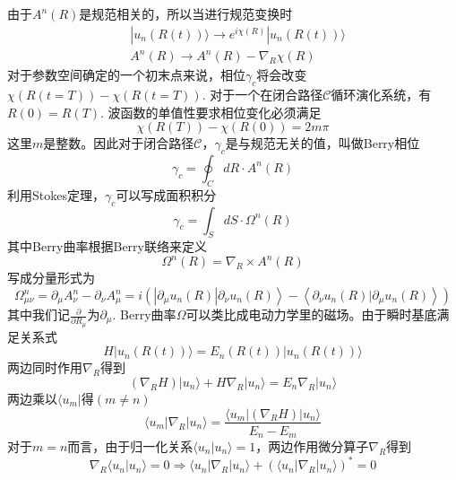 \documentclass{article}
\numberwithin{equation}{subsection}
\begin{document}
由于$A^n(R)$是规范相关的，所以当进行规范变换时
\begin{equation}
    \begin{split}
        &|u_n(R(t))\rangle\rightarrow e^{i\chi(R)}|u_n(R(t))\rangle\\
        &A^n(R)\rightarrow A^n(R)-\nabla_R\chi(R)
    \end{split}
\end{equation}
对于参数空间确定的一个初末点来说，相位$\gamma_c$将会改变$\chi(R(t=T))-\chi(R(t=T))$. 对于一个在闭合路径$\mathcal{C}$循环演化系统，有$R(0)=R(T)$. 波函数的单值性要求相位变化必须满足
\begin{equation}
    \chi(R(T))-\chi(R(0))=2m\pi
\end{equation}
这里$m$是整数。因此对于闭合路径$\mathcal{C}$，$\gamma_c$是与规范无关的值，叫做Berry相位
\begin{equation}
    \gamma_c=\oint_C dR\cdot A^n(R)
\end{equation}
利用Stokes定理，$\gamma_c$可以写成面积积分
\begin{equation}
    \gamma_c=\int_S dS\cdot\Omega^n(R)
\end{equation}
其中Berry曲率根据Berry联络来定义
\begin{equation}
    \Omega^n(R)=\nabla_R\times A^n(R)
\end{equation}
写成分量形式为
\begin{equation}
    \Omega_{\mu\nu}^n=\partial_\mu A_\nu^n-\partial_\nu A_\mu^n=i\left.\left(\left|\partial_{\mu} u_{n}(R)\right| \partial_{\nu} u_{n}(R)\right\rangle-\left\langle\partial_{\nu} u_{n}(R) | \partial_{\mu} u_{n}(R)\right\rangle\right)
\end{equation}
其中我们记$\frac{\partial}{\partial R_\mu}$为$\partial_\mu$. Berry曲率$\Omega$可以类比成电动力学里的磁场。由于瞬时基底满足关系式
\begin{equation}
    H|u_n(R(t))\rangle=E_n(R(t))|u_n(R(t))\rangle
\end{equation}
两边同时作用$\nabla_R$得到
\begin{equation}
    (\nabla_RH)|u_n\rangle+H\nabla_R|u_n\rangle=E_n\nabla_R|u_n\rangle
\end{equation}
两边乘以$\langle u_m|$得$(m\neq n)$
\begin{equation}
    \langle u_m|\nabla_R|u_n\rangle=\frac{\langle u_m|(\nabla_RH)|u_n\rangle}{E_n-E_m}
\end{equation}
对于$m=n$而言，由于归一化关系$\langle u_n|u_n\rangle=1$，两边作用微分算子$\nabla_R$得到
\begin{equation}
    \nabla_R\langle u_n|u_n\rangle=0\Rightarrow\langle u_n|\nabla_R|u_n\rangle+(\langle u_n|\nabla_R|u_n\rangle)^*=0
\end{equation}
\end{document}
